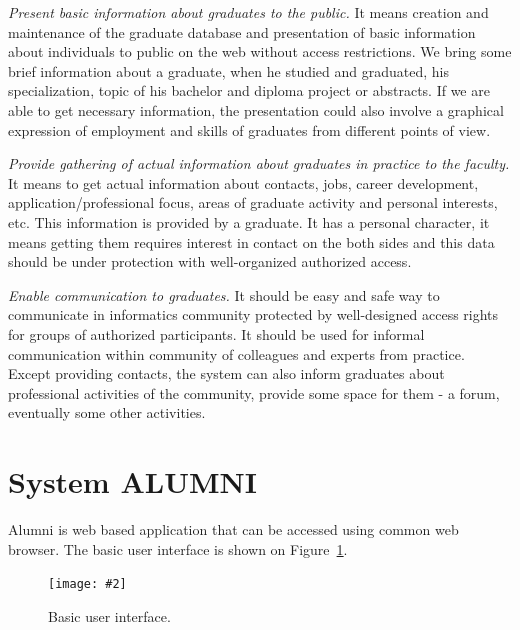 \documentclass{iitsrc}[2006/14/02]
\newcommand\fig[4]{%
	\begin{figure}[h]
	\begin{center}
	\texttt{[image: \#2]}
	~\\%
	\caption{#4}
	\label{#3}
	\end{center}
	\end{figure}
}
\begin{document}
{\em Present basic information about graduates to the public.}
It means creation and maintenance of the graduate database and presentation of basic information about individuals to public on the web without access restrictions. We bring some brief information about a graduate, when he studied and graduated, his specialization, topic of his bachelor and diploma project or abstracts. If we are able to get necessary information, the presentation could also involve a graphical expression of employment and skills of graduates from different points of view.

{\em Provide gathering of actual information about graduates in practice to the faculty.} 
It means to get actual information about contacts, jobs, career development, application/professional focus, areas of graduate activity and personal interests, etc. This information is provided by a graduate. It has a personal character, it means getting them requires interest in contact on the both sides and this data should be under protection with well-organized authorized access.

{\em Enable communication to graduates.}
It should be easy and safe way to communicate in informatics community protected by well-designed access rights for groups of authorized participants. It should be used for informal communication within community of colleagues and experts from practice. Except providing contacts, the system can also inform graduates about professional activities of the community, provide some space for them - a forum, eventually some other activities.


\section{System ALUMNI}

Alumni is web based application that can be accessed using common web browser. The basic user interface is shown on Figure~\ref{fig:scr1}. 

\fig{width=12cm, bb = 0 0 831 683}{images/screen1.png}{fig:scr1}{Basic user interface.}
\end{document}
